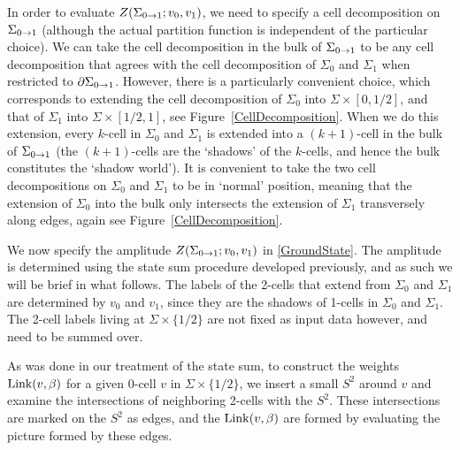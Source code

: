 In order to evaluate $Z(\Sigma_{0\rightarrow1}; v_0, v_1)$, we need to specify a cell decomposition on $\Sigma_{0\rightarrow 1}$ (although the actual partition function is independent of the particular choice). 
We can take the cell decomposition in the bulk of $\Sigma_{0\rightarrow1}$ to be any cell decomposition that agrees with the cell decomposition of $\Sigma_0$ and $\Sigma_1$ when restricted to $\partial \Sigma_{0\rightarrow1}$.
However, there is a particularly convenient choice, which corresponds to extending the cell decomposition of $\Sigma_0$ into $\Sigma \times [0, 1/2]$, and that of $\Sigma_1$ into $\Sigma \times [1/2, 1]$, see Figure~\ref{CellDecomposition}. 
When we do this extension, every $k$-cell in $\Sigma_0$ and $\Sigma_1$ is extended into a $(k+1)$-cell in the bulk 
of $\Sigma_{0\rightarrow1}$ (the $(k+1)$-cells are the `shadows' of the $k$-cells, and hence the bulk constitutes the `shadow world'). 
It is convenient to take the two cell decompositions on $\Sigma_0$ and $\Sigma_1$ to be in `normal' position,
meaning that the extension of $\Sigma_0$ into the bulk only intersects the extension of $\Sigma_1$ transversely along edges, again see Figure~\ref{CellDecomposition}.


We now specify the amplitude $Z(\Sigma_{0\rightarrow 1}; v_0, v_1) $ in \eqref{GroundState}.
The amplitude is determined using the state sum procedure developed previously, and as such we will be brief in what follows. 
The labels of the 2-cells that extend from $\Sigma_0$ and $\Sigma_1$ are determined by $v_0$ and 
$v_1$, since they are the shadows of 1-cells in $\Sigma_0$ and $\Sigma_1$. 
The 2-cell labels living at $\Sigma \times \{ 1/2 \}$ are not fixed as input data however, and need to be 
summed over.

As was done in our treatment of the state sum, to construct the weights ${\rm Link}(v,\beta)$ for a given 0-cell $v$ in $\Sigma \times \{1/2\}$, we insert a small $S^2$ around 
$v$ and examine the intersections of neighboring 2-cells with the $S^2$. These intersections 
are marked on the $S^2$ as edges, and the ${\rm Link}(v,\beta)$ are formed by evaluating 
the picture formed by these edges. 

